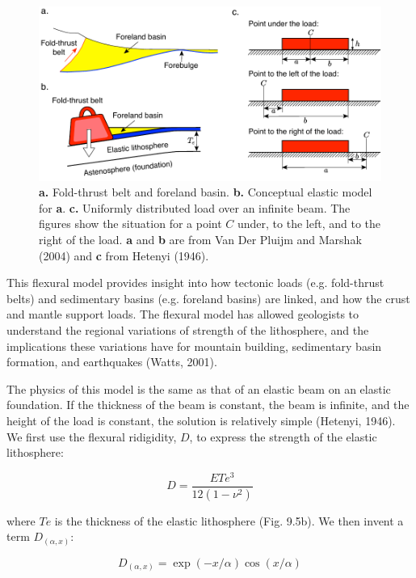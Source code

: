 \documentclass[a4paper , 12pt]{book}
\begin{document}
\begin{figure}[ht]
    \centering
    \includegraphics[width=14cm]{ch9f6.pdf}
    \caption{\textbf{a.} Fold-thrust belt and foreland basin. \textbf{b.} Conceptual elastic model for \textbf{a}. \textbf{c.} Uniformly distributed load over an infinite beam. The figures show the situation for a point $C$ under, to the left, and to the right of the load. \textbf{a} and \textbf{b} are from Van Der Pluijm and Marshak (2004) and \textbf{c} from Hetenyi (1946).}
\end{figure}

This flexural model provides insight into how tectonic loads (e.g. fold-thrust belts) and sedimentary basins (e.g. foreland basins) are linked, and how the crust and mantle support loads. The flexural model has allowed geologists to understand the regional variations of strength of the lithosphere, and the implications these variations have for mountain building, sedimentary basin formation, and earthquakes (Watts, 2001).

The physics of this model is the same as that of an elastic beam on an elastic foundation. If the thickness of the beam is constant, the beam is infinite, and the height of the load is constant, the solution is relatively simple (Hetenyi, 1946). We first use the flexural ridigidity, $D$, to express the strength of the elastic lithosphere:

\begin{equation}
    D=\frac{ETe^3}{12(1-\nu^2)}
\end{equation}

where $Te$ is the thickness of the elastic lithosphere (Fig. 9.5b). We then invent a term $D_{(\alpha,x)}$:

\begin{equation}\label{eq9.12}
    D_{(\alpha,x)}=\exp(-x/\alpha)\cos(x/\alpha)
\end{equation}
\end{document}
